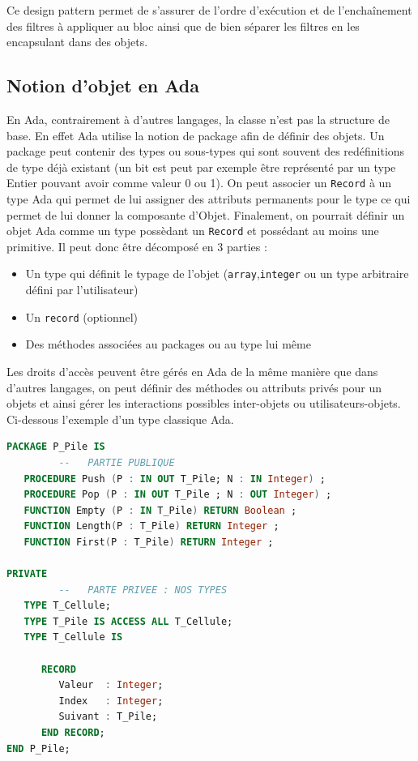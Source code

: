 \documentclass[a4paper]{article}
\begin{document}
Ce design pattern permet de s'assurer de l'ordre d'exécution et de l'enchaînement des filtres à appliquer au bloc ainsi que de bien séparer les filtres en les encapsulant dans des objets.
\newpage


\subsection{Notion d'objet en Ada}
En Ada, contrairement à d'autres langages, la classe n'est pas la structure de base. En effet Ada utilise la notion de package afin de définir des objets. Un package peut contenir des types ou sous-types qui sont souvent des redéfinitions de type déjà existant (un bit est peut par exemple être représenté par un type Entier pouvant avoir comme valeur 0 ou 1). On peut associer un \texttt{Record} à un type Ada qui permet de lui assigner des attributs permanents pour le type ce qui permet de lui donner la composante d'Objet.
\smallbreak
Finalement, on pourrait définir un objet Ada comme un type possèdant un \texttt{Record} et possédant au moins une primitive. Il peut donc être décomposé en 3 parties : 
\begin{itemize}
\item Un type qui définit le typage de l'objet (\texttt{array},\texttt{integer} ou un type arbitraire défini par l'utilisateur)
\item Un \texttt{record} (optionnel)
\item Des méthodes associées au packages ou au type lui même
\end{itemize}
\smallbreak
Les droits d'accès peuvent être gérés en Ada de la même manière que dans d'autres langages, on peut définir des méthodes ou attributs privés pour un objets et ainsi gérer les interactions possibles inter-objets ou utilisateurs-objets. Ci-dessous l'exemple d'un type classique Ada.

\begin{lstlisting}[language=Ada]
PACKAGE P_Pile IS
         --   PARTIE PUBLIQUE
   PROCEDURE Push (P : IN OUT T_Pile; N : IN Integer) ;
   PROCEDURE Pop (P : IN OUT T_Pile ; N : OUT Integer) ;
   FUNCTION Empty (P : IN T_Pile) RETURN Boolean ;
   FUNCTION Length(P : T_Pile) RETURN Integer ;   
   FUNCTION First(P : T_Pile) RETURN Integer ;

PRIVATE
         --   PARTE PRIVEE : NOS TYPES
   TYPE T_Cellule;
   TYPE T_Pile IS ACCESS ALL T_Cellule;
   TYPE T_Cellule IS

      RECORD
         Valeur  : Integer;
         Index   : Integer;
         Suivant : T_Pile; 
      END RECORD;
END P_Pile;
\end{lstlisting}
\end{document}
